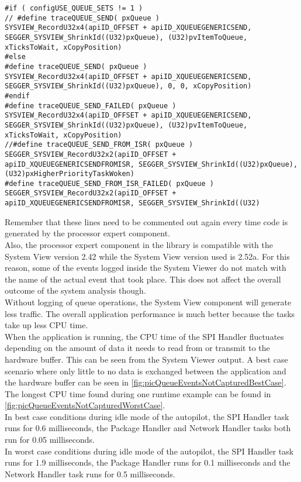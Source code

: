 \begin{lstlisting}
#if ( configUSE_QUEUE_SETS != 1 )
// #define traceQUEUE_SEND( pxQueue )                                    SYSVIEW_RecordU32x4(apiID_OFFSET + apiID_XQUEUEGENERICSEND, SEGGER_SYSVIEW_ShrinkId((U32)pxQueue), (U32)pvItemToQueue, xTicksToWait, xCopyPosition)
#else
#define traceQUEUE_SEND( pxQueue )                                    SYSVIEW_RecordU32x4(apiID_OFFSET + apiID_XQUEUEGENERICSEND, SEGGER_SYSVIEW_ShrinkId((U32)pxQueue), 0, 0, xCopyPosition)
#endif
#define traceQUEUE_SEND_FAILED( pxQueue )                             SYSVIEW_RecordU32x4(apiID_OFFSET + apiID_XQUEUEGENERICSEND, SEGGER_SYSVIEW_ShrinkId((U32)pxQueue), (U32)pvItemToQueue, xTicksToWait, xCopyPosition)
//#define traceQUEUE_SEND_FROM_ISR( pxQueue )                           SEGGER_SYSVIEW_RecordU32x2(apiID_OFFSET + apiID_XQUEUEGENERICSENDFROMISR, SEGGER_SYSVIEW_ShrinkId((U32)pxQueue), (U32)pxHigherPriorityTaskWoken)
#define traceQUEUE_SEND_FROM_ISR_FAILED( pxQueue )                    SEGGER_SYSVIEW_RecordU32x2(apiID_OFFSET + apiID_XQUEUEGENERICSENDFROMISR, SEGGER_SYSVIEW_ShrinkId((U32)
\end{lstlisting}
Remember that these lines need to be commented out again every time code is generated by the processor expert component.\\
Also, the processor expert component in the library is compatible with the System View version 2.42 while the System View version used is 2.52a. For this reason, some of the events logged inside the System Viewer do not match with the name of the actual event that took place. This does not affect the overall outcome of the system analysis though.\\
Without logging of queue operations, the System View component will generate less traffic. The overall application performance is much better because the tasks take up less CPU time.\\
When the application is running, the CPU time of the SPI Handler fluctuates depending on the amount of data it needs to read from or transmit to the hardware buffer. This can be seen from the System Viewer output. A best case scenario where only little to no data is exchanged between the application and the hardware buffer can be seen in \autoref{fig:picQueueEventsNotCapturedBestCase}. The longest CPU time found during one runtime example can be found in \autoref{fig:picQueueEventsNotCapturedWorstCase}.\\
In best case conditions during idle mode of the autopilot, the SPI Handler task runs for 0.6 milliseconds, the Package Handler and Network Handler tasks both run for 0.05 milliseconds.	\\
In worst case conditions during idle mode of the autopilot, the SPI Handler task runs for 1.9 milliseconds, the Package Handler runs for 0.1 milliseconds and the Network Handler task runs for 0.5 milliseconds.
%
%
%
%
%
%
%
